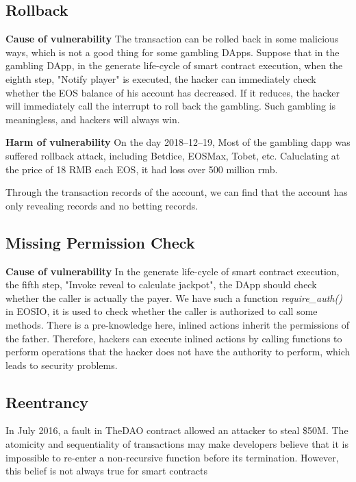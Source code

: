 \documentclass[a4paper, 10pt, conference, twocolumn]{ieeeconf}       %
\begin{document}
\subsection{Rollback}\label{3.3}
\textbf{Cause of vulnerability} 
The transaction can be rolled back in some malicious ways,
which is not a good thing for some gambling DApps.
Suppose that in the gambling DApp,
in the generate life-cycle of smart contract execution,
when the eighth step, "Notify player" is executed,
the hacker can immediately check whether the EOS balance of his account has decreased.
If it reduces,
the hacker will immediately call the interrupt to roll back the gambling.
Such gambling is meaningless, and hackers will always win.

\textbf{Harm of vulnerability}
On the day 2018–12–19,
Most of the gambling dapp was suffered rollback attack,
including Betdice, EOSMax, Tobet, etc.
Caluclating at the price of 18 RMB each EOS,
it had loss over 500 million rmb.\cite{slowmist:2019}

Through the transaction records of the account, we can find that the account has only revealing records and no betting records.

\subsection{Missing Permission Check}\label{3.4}
\textbf{Cause of vulnerability} 
In the generate life-cycle of smart contract execution,
the fifth step, "Invoke reveal to calculate jackpot",
the DApp should check whether the caller is actually the payer.
We have such a function \emph{require\_auth()\*} in EOSIO,
it is used to check whether the caller is authorized to call some methods.
There is a pre-knowledge here,
inlined actions inherit the permissions of the father.
Therefore, hackers can execute inlined actions by calling functions to perform operations that the hacker does not have the authority to perform,
which leads to security problems.

\subsection{Reentrancy}

In July 2016, a fault in TheDAO contract allowed an attacker to steal \$50M.
The atomicity and sequentiality of transactions may make developers believe that it is impossible to re-enter a non-recursive function before its termination. However, this belief is not always true for smart contracts
\end{document}
